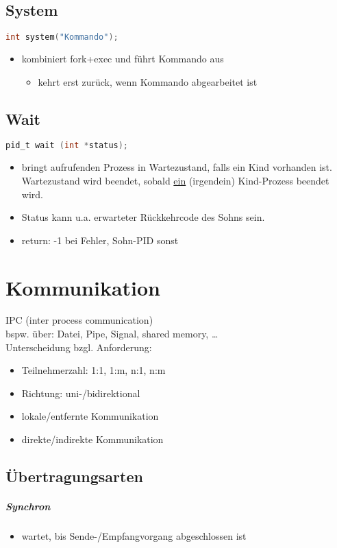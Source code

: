 \documentclass{scrreprt}
\renewcommand{\imptnt}[1]{#1}
\begin{document}
\section{System}
\begin{lstlisting}[language=C]
int system("Kommando");
\end{lstlisting}
\begin{itemize}
\item kombiniert fork+exec und führt Kommando aus
\begin{itemize}[label=$\to$]
\item kehrt erst zurück, wenn Kommando abgearbeitet ist
\end{itemize}
\end{itemize}
\section{Wait}
\begin{lstlisting}[language=C]
pid_t wait (int *status);
\end{lstlisting}
\begin{itemize}
\item bringt aufrufenden Prozess \imptnt{in Wartezustand}, falls ein Kind vorhanden ist. Wartezustand wird \imptnt{beendet, sobald \underline{ein} (irgendein) Kind-Prozess beendet} wird.
\item Status kann u.a. erwarteter Rückkehrcode des Sohns sein.
\item return: -1 bei Fehler, Sohn-PID sonst
\end{itemize}
\chapter{Kommunikation}
IPC (inter process communication)\\
bspw. über: Datei, Pipe, Signal, shared memory, …\\
Unterscheidung bzgl. Anforderung:
\begin{itemize}
\item Teilnehmerzahl: 1:1, 1:m, n:1, n:m
\item Richtung: uni-/bidirektional
\item lokale/entfernte Kommunikation
\item direkte/indirekte Kommunikation
\end{itemize}
\section{Übertragungsarten}
\paragraph{\imptnt{Synchron}}
\begin{itemize}
\item wartet, bis Sende-/Empfangvorgang abgeschlossen ist
\end{itemize}
\end{document}
